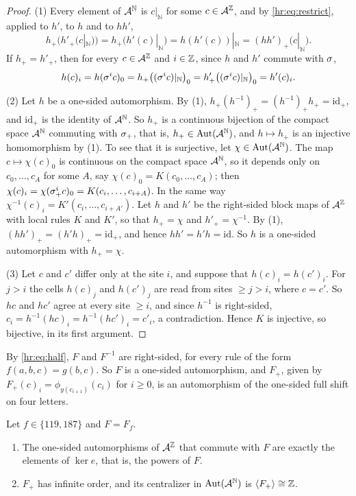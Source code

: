 \begin{proof}
(1) Every element of $\mathcal{A}^{\mathbb N}$ is $c|_{\mathbb N}$ for some $c\in\mathcal{A}^{\mathbb{Z}}$, and by \eqref{hr:eq:restrict}, applied to $h'$, to $h$ and to $hh'$,
\[
h_+\bigl(h'_+(c|_{\mathbb N})\bigr)=h_+\bigl(h'(c)|_{\mathbb N}\bigr)=h(h'(c))|_{\mathbb N}=(hh')_+\bigl(c|_{\mathbb N}\bigr).
\]
If $h_+=h'_+$, then for every $c\in\mathcal{A}^{\mathbb{Z}}$ and $i\in\mathbb{Z}$, since $h$ and $h'$ commute with $\sigma$,
\[
h(c)_i=h(\sigma^ic)_0=h_+\bigl((\sigma^ic)|_{\mathbb N}\bigr)_0=h'_+\bigl((\sigma^ic)|_{\mathbb N}\bigr)_0=h'(c)_i.
\]

(2) Let $h$ be a one-sided automorphism. By (1), $h_+(h^{-1})_+=(h^{-1})_+h_+=\mathrm{id}_+$, and $\mathrm{id}_+$ is the identity of $\mathcal{A}^{\mathbb N}$. So $h_+$ is a continuous bijection of the compact space $\mathcal{A}^{\mathbb N}$ commuting with $\sigma_+$, that is, $h_+\in\operatorname{Aut}(\mathcal{A}^{\mathbb N})$, and $h\mapsto h_+$ is an injective homomorphism by (1). To see that it is surjective, let $\chi\in\operatorname{Aut}(\mathcal{A}^{\mathbb N})$. The map $c\mapsto\chi(c)_0$ is continuous on the compact space $\mathcal{A}^{\mathbb N}$, so it depends only on $c_0,\dots,c_A$ for some $A$, say $\chi(c)_0=K(c_0,\dots,c_A)$; then $\chi(c)_i=\chi(\sigma_+^ic)_0=K(c_i,\dots,c_{i+A})$. In the same way $\chi^{-1}(c)_i=K'(c_i,\dots,c_{i+A'})$. Let $h$ and $h'$ be the right-sided block maps of $\mathcal{A}^{\mathbb{Z}}$ with local rules $K$ and $K'$, so that $h_+=\chi$ and $h'_+=\chi^{-1}$. By (1), $(hh')_+=(h'h)_+=\mathrm{id}_+$, and hence $hh'=h'h=\mathrm{id}$. So $h$ is a one-sided automorphism with $h_+=\chi$.

(3) Let $c$ and $c'$ differ only at the site $i$, and suppose that $h(c)_i=h(c')_i$. For $j>i$ the cells $h(c)_j$ and $h(c')_j$ are read from sites $\ge j>i$, where $c=c'$. So $hc$ and $hc'$ agree at every site $\ge i$, and since $h^{-1}$ is right-sided, $c_i=h^{-1}(hc)_i=h^{-1}(hc')_i=c'_i$, a contradiction. Hence $K$ is injective, so bijective, in its first argument.
\end{proof}

By \eqref{hr:eq:half}, $F$ and $F^{-1}$ are right-sided, for every rule of the form $f(a,b,c)=g(b,c)$. So $F$ is a one-sided automorphism, and $F_+$, given by $F_+(c)_i=\phi_{y(c_{i+1})}(c_i)$ for $i\ge0$, is an automorphism of the one-sided full shift on four letters.

\begin{corollary}\label{hr:cor:onesided}
Let $f\in\{119,187\}$ and $F=F_f$.
\begin{enumerate}
\item The one-sided automorphisms of $\mathcal{A}^{\mathbb{Z}}$ that commute with $F$ are exactly the elements of $\ker e$, that is, the powers of $F$.
\item $F_+$ has infinite order, and its centralizer in $\operatorname{Aut}(\mathcal{A}^{\mathbb N})$ is $\langle F_+\rangle\cong\mathbb{Z}$.
\end{enumerate}
\end{corollary}

